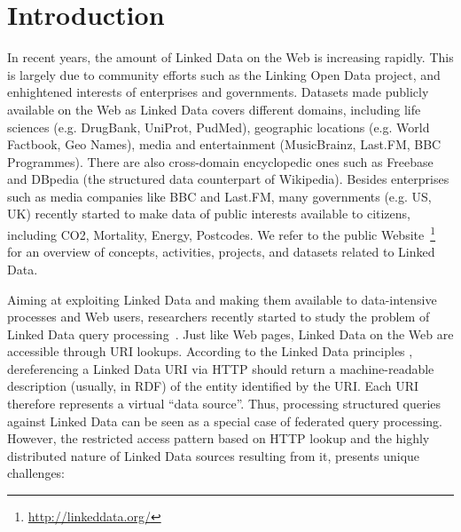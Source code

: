 \section{Introduction}
\label{sec:linked_data} 

In recent years, the amount of Linked Data on the Web is increasing
rapidly. This is largely due to community efforts such as the Linking
Open Data project, and enhightened interests of enterprises and
governments. Datasets made publicly available on the Web as Linked
Data covers different domains, including life sciences (e.g. DrugBank,
UniProt, PudMed), geographic locations (e.g. World Factbook, Geo
Names), media and entertainment (MusicBrainz, Last.FM, BBC
Programmes). There are also cross-domain encyclopedic ones such as
Freebase and DBpedia (the structured data counterpart of
Wikipedia). Besides enterprises such as media companies like BBC and
Last.FM, many governments (e.g. US, UK) recently started to make data
of public interests available to citizens, including CO2, Mortality,
Energy, Postcodes. We refer to the public
Website~\footnote{\url{http://linkeddata.org/}} for an overview of
concepts, activities, projects, and datasets related to Linked Data.

Aiming at exploiting Linked Data and making them available to
data-intensive processes and Web users, researchers recently started
to study the problem of Linked Data query
processing~\cite{hartig_executing_2009,harth_data_2010,ladwig_linked_2010}. Just
like Web pages, Linked Data on the Web are accessible through URI
lookups. According to the Linked Data principles
\cite{bizer_linked_2009}, dereferencing a Linked Data URI via HTTP
should return a machine-readable description (usually, in RDF) of the
entity identified by the URI. Each URI therefore represents a virtual
``data source''. 
Thus, processing structured queries against Linked Data can be seen as
a special case of federated query processing. However, the restricted
access pattern based on HTTP lookup and the highly distributed nature
of Linked Data sources resulting from it, presents unique challenges:

